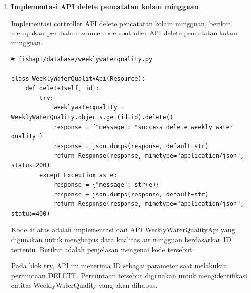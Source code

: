 \begin{enumerate}[1.]
Dengan demikian, kode ini mengimplementasikan logika untuk menerima permintaan PUT dengan ID sebagai parameter, mengambil data dari permintaan, dan memperbarui entitas WeeklyWaterQuality yang sesuai dengan nilai-nilai baru.

Berikut merupakan hasil test request dari API edit pencatatan kolam mingguan.

cURL:

\begin{lstlisting}
curl --location --request PUT 'http://jft.web.id/fishapi/api/weeklywaterquality/62e92ea6602825ffd3a1d2c1' \
--form 'floc="11-30"' \
--form 'nitrite="20"' \
--form 'nitrate="100"' \
--form 'ammonia="1.5"' \
--form 'hardness="250"'
\end{lstlisting}

response json:

\begin{lstlisting}
{
  "message": "success change data weekly water quality",
  "id": "62e92ea6602825ffd3a1d2c1"
}
\end{lstlisting}



\item \textbf{Implementasi API delete pencatatan kolam mingguan}

Implementasi controller API delete pencatatan kolam mingguan, berikut merupakan perubahan source code controller API delete pencatatan kolam mingguan.

\begin{lstlisting}
# fishapi/database/weeklywaterquality.py

class WeeklyWaterQualityApi(Resource):
    def delete(self, id):
        try:
            weeklywaterquality = WeeklyWaterQuality.objects.get(id=id).delete()
            response = {"message": "success delete weekly water quality"}
            response = json.dumps(response, default=str)
            return Response(response, mimetype="application/json", status=200)
        except Exception as e:
            response = {"message": str(e)}
            response = json.dumps(response, default=str)
            return Response(response, mimetype="application/json", status=400)
\end{lstlisting}


Kode di atas adalah implementasi dari API WeeklyWaterQualityApi yang digunakan untuk menghapus data kualitas air mingguan berdasarkan ID tertentu. Berikut adalah penjelasan mengenai kode tersebut:

Pada blok try, API ini menerima ID sebagai parameter saat melakukan permintaan DELETE. Permintaan tersebut digunakan untuk mengidentifikasi entitas WeeklyWaterQuality yang akan dihapus.


\end{enumerate}
